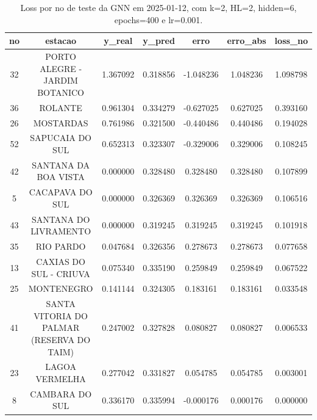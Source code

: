 \begin{table}[h]
\centering
\caption{Loss por no de teste da GNN em 2025-01-12, com k=2, HL=2, hidden=6, epochs=400 e lr=0.001.}
\label{tab:gnn_loss_k2_hl2_h6_e400_d20250112}
\begin{tabular}{ccccccc}
\toprule
no & estacao & y\_real & y\_pred & erro & erro\_abs & loss\_no \\
\midrule
32 & PORTO ALEGRE - JARDIM BOTANICO & 1.367092 & 0.318856 & -1.048236 & 1.048236 & 1.098798 \\
36 & ROLANTE & 0.961304 & 0.334279 & -0.627025 & 0.627025 & 0.393160 \\
26 & MOSTARDAS & 0.761986 & 0.321500 & -0.440486 & 0.440486 & 0.194028 \\
52 & SAPUCAIA DO SUL & 0.652313 & 0.323307 & -0.329006 & 0.329006 & 0.108245 \\
42 & SANTANA DA BOA VISTA & 0.000000 & 0.328480 & 0.328480 & 0.328480 & 0.107899 \\
5 & CACAPAVA DO SUL & 0.000000 & 0.326369 & 0.326369 & 0.326369 & 0.106516 \\
43 & SANTANA DO LIVRAMENTO & 0.000000 & 0.319245 & 0.319245 & 0.319245 & 0.101918 \\
35 & RIO PARDO & 0.047684 & 0.326356 & 0.278673 & 0.278673 & 0.077658 \\
13 & CAXIAS DO SUL - CRIUVA & 0.075340 & 0.335190 & 0.259849 & 0.259849 & 0.067522 \\
25 & MONTENEGRO & 0.141144 & 0.324305 & 0.183161 & 0.183161 & 0.033548 \\
41 & SANTA VITORIA DO PALMAR (RESERVA DO TAIM) & 0.247002 & 0.327828 & 0.080827 & 0.080827 & 0.006533 \\
23 & LAGOA VERMELHA & 0.277042 & 0.331827 & 0.054785 & 0.054785 & 0.003001 \\
8 & CAMBARA DO SUL & 0.336170 & 0.335994 & -0.000176 & 0.000176 & 0.000000 \\
\bottomrule
\end{tabular}
\end{table}
